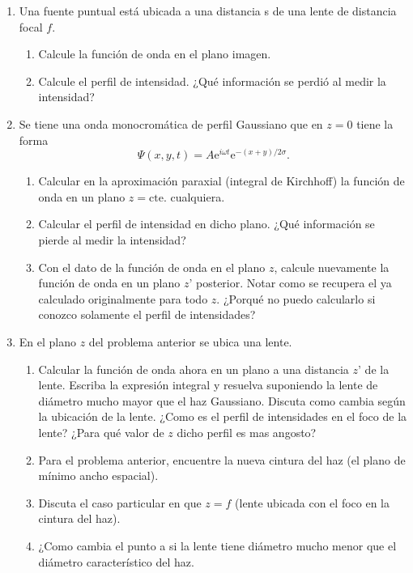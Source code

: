 \documentclass[11pt,spanish,a4paper]{article}
\begin{document}
\begin{enumerate}
\item Una fuente puntual está ubicada a una distancia s de una lente de distancia focal \( f \).
	\begin{enumerate}	
		\item Calcule la función de onda en el plano imagen.
		\item Calcule el perfil de intensidad.
			¿Qué información se perdió al medir la intensidad?
	\end{enumerate}	

	
\item Se tiene una onda monocromática de perfil Gaussiano que en \( z= 0 \) tiene la forma
	\[
		\Psi( x, y, t ) = A \mathrm{e}^{ i \omega t } \mathrm{e}^{- ( x + y ) / 2 \sigma }.
	\]
	\begin{enumerate}	
		\item Calcular en la aproximación paraxial (integral de Kirchhoff) la función de onda en un plano \( z=\mathrm{cte.} \) cualquiera.
		\item Calcular el perfil de intensidad en dicho plano.
			¿Qué información se pierde al medir la intensidad?
		\item Con el dato de la función de onda en el plano \( z \), calcule nuevamente la función de onda en un plano \( z’ \) posterior.
			Notar como se recupera el ya calculado originalmente para todo \( z \).
			¿Porqué no puedo calcularlo si conozco solamente el perfil de intensidades?
	\end{enumerate}	

		
\item En el plano \( z \) del problema anterior se ubica una lente.
	\begin{enumerate}	
		\item Calcular la función de onda ahora en un plano a una distancia \( z’ \) de la lente.
			Escriba la expresión integral y resuelva suponiendo la lente de diámetro mucho mayor que el haz Gaussiano.
			Discuta como cambia según la ubicación de la lente.
			¿Como es el perfil de intensidades en el foco de la lente?
			¿Para qué valor de \( z \) dicho perfil es mas angosto?
		\item Para el problema anterior, encuentre la nueva cintura del haz (el plano de mínimo ancho espacial).
		\item Discuta el caso particular en que \( z= f \) (lente ubicada con el foco en la cintura del haz).
		\item ¿Como cambia el punto a si la lente tiene diámetro mucho menor que el diámetro característico del haz.
	\end{enumerate}	

\end{enumerate}	
\end{document}
